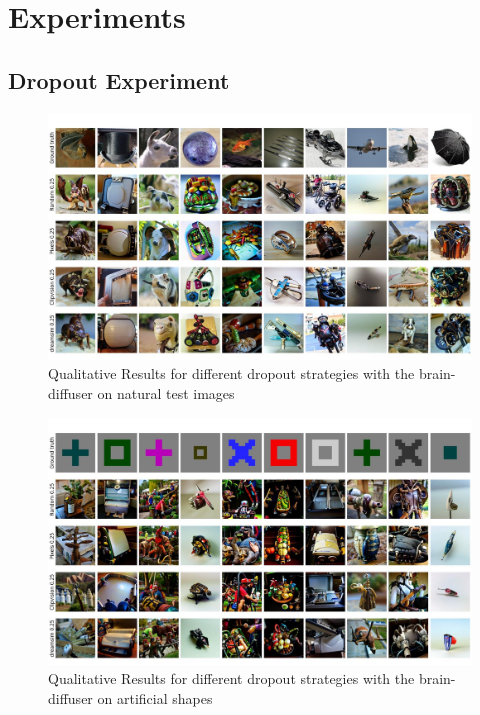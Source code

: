 \chapter{Experiments}
\section{Dropout Experiment}

\begin{figure}[ht]
   \centering
   \includegraphics[width=1\textwidth]{plots/dropout_qual_eval_bd_test.JPEG}
   \caption{Qualitative Results for different dropout strategies with the brain-diffuser on natural test images}\label{fig:dropout_qual_eval_bd_test}
\end{figure}

\begin{figure}[ht]
   \centering
   \includegraphics[width=1\textwidth]{plots/dropout_qual_eval_bd_art.JPEG}
   \caption{Qualitative Results for different dropout strategies with the brain-diffuser on artificial shapes}\label{fig:dropout_qual_eval_bd_art}
\end{figure}


